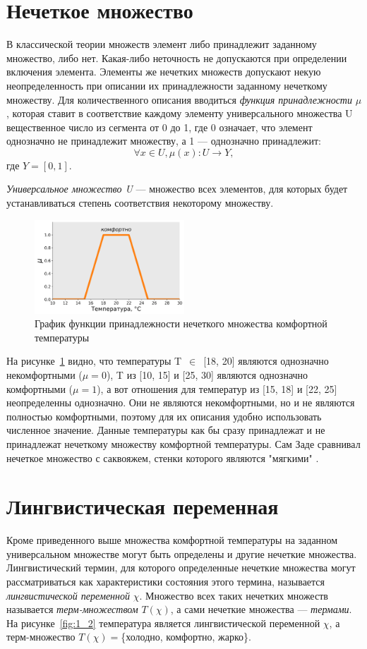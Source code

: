 \documentclass[a4paper,12pt]{article}
\begin{document}
	\section{Нечеткое множество}
	
	В классической теории множеств элемент либо принадлежит заданному множество, либо нет. Какая-либо неточность не допускаются при определении включения элемента. Элементы же нечетких множеств допускают некую неопределенность при описании их принадлежности заданному нечеткому множеству. Для количественного описания вводиться \textit{функция принадлежности} $\mu$, которая ставит в соответствие каждому элементу универсального множества U вещественное число из сегмента от 0 до 1, где 0 означает, что элемент однозначно не принадлежит множеству, а 1 — однозначно принадлежит:
	\[ \forall x \in U, \mu(x): U{\longrightarrow }Y, \]
	где  $Y=[0,1]$.
	
	\textit{Универсальное множество U} — множество всех элементов, для которых будет устанавливаться степень соответствия некоторому множеству. 
	
	\begin{figure}[h]
		\centering
		\includegraphics[width=0.5\textwidth]{Figure_1_1}
		\caption{График функции принадлежности нечеткого множества комфортной температуры}
		\label{fig:1_1}
	\end{figure}
	
	На рисунке~\ref{fig:1_1} видно, что температуры T~$\in$~[18, 20] являются однозначно некомфортными ($\mu=0$), T из [10, 15] и [25, 30] являются однозначно комфортными ($\mu=1$), а вот отношения для температур из [15, 18] и [22, 25] неопределенны однозначно. Они не являются некомфортными, но и не являются полностью комфортными, поэтому для их описания удобно использовать численное значение. Данные температуры как бы сразу принадлежат и не принадлежат нечеткому множеству комфортной температуры. Сам Заде сравнивал нечеткое множество с саквояжем, стенки которого являются "мягкими" \cite{Zade}.
	
	\section{Лингвистическая переменная}
	Кроме приведенного выше множества комфортной температуры на заданном универсальном множестве могут быть определены и другие нечеткие множества. Лингвистический термин, для которого определенные нечеткие множества могут рассматриваться как характеристики состояния этого термина, называется \textit{лингвистической переменной} $\chi$. Множество всех таких нечетких множеств называется \textit{терм-множеством} $T(\chi)$, а сами нечеткие множества — \textit{термами}. На рисунке~\ref{fig:1_2} температура является лингвистической переменной $\chi$, а терм-множество $T(\chi)=$\{холодно, комфортно, жарко\}.
	
\end{document}
